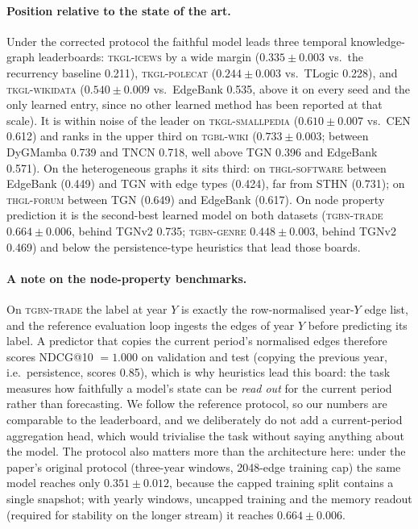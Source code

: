 \paragraph{Position relative to the state of the art.}
Under the corrected protocol the faithful model leads three temporal
knowledge-graph leaderboards: \textsc{tkgl-icews} by a wide margin
($0.335 \pm 0.003$ vs.\ the recurrency baseline 0.211),
\textsc{tkgl-polecat} ($0.244 \pm 0.003$ vs.\ TLogic 0.228), and
\textsc{tkgl-wikidata} ($0.540 \pm 0.009$ vs.\ EdgeBank 0.535, above it on
every seed and the only learned entry, since no other learned method has
been reported at that scale). It is within noise of the leader on
\textsc{tkgl-smallpedia} ($0.610 \pm 0.007$ vs.\ CEN 0.612) and ranks in the
upper third on \textsc{tgbl-wiki} ($0.733 \pm 0.003$; between DyGMamba 0.739
and TNCN 0.718, well above TGN 0.396 and EdgeBank 0.571). On the
heterogeneous graphs it sits third: on \textsc{thgl-software} between
EdgeBank (0.449) and TGN with edge types (0.424), far from STHN (0.731); on
\textsc{thgl-forum} between TGN (0.649) and EdgeBank (0.617). On node
property prediction it is the second-best learned model on both datasets
(\textsc{tgbn-trade} $0.664 \pm 0.006$, behind TGNv2 0.735;
\textsc{tgbn-genre} $0.448 \pm 0.003$, behind TGNv2 0.469) and below the
persistence-type heuristics that lead those boards.

\paragraph{A note on the node-property benchmarks.}
On \textsc{tgbn-trade} the label at year $Y$ is exactly the row-normalised
year-$Y$ edge list, and the reference evaluation loop ingests the edges of
year $Y$ before predicting its label. A predictor that copies the current
period's normalised edges therefore scores NDCG@10 $=1.000$ on validation and
test (copying the previous year, i.e.\ persistence, scores 0.85), which is
why heuristics lead this board: the task measures how faithfully a model's
state can be \emph{read out} for the current period rather than forecasting.
We follow the reference protocol, so our numbers are comparable to the
leaderboard, and we deliberately do not add a current-period aggregation
head, which would trivialise the task without saying anything about the
model. The protocol also matters more than the architecture here: under the
paper's original protocol (three-year windows, 2048-edge training cap) the
same model reaches only $0.351 \pm 0.012$, because the capped training
split contains a single snapshot; with yearly windows, uncapped training and
the memory readout (required for stability on the longer stream) it reaches
$0.664 \pm 0.006$.

